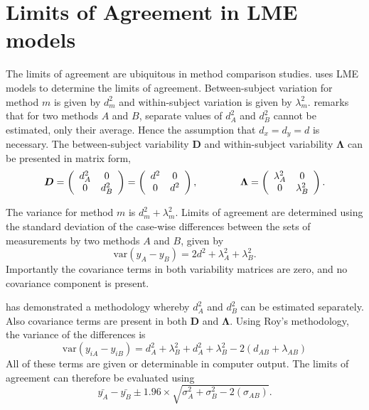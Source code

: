 \documentclass[12pt, a4paper]{report}
\theoremstyle{plain}
\theoremstyle{definition}
\theoremstyle{remark}
\begin{document}
\section{Limits of Agreement in LME models}
The limits of agreement \citep{BA86} are ubiquitous in method comparison studies. \citet{BXC2008} uses LME models to determine the limits of agreement. Between-subject variation for method $m$ is given by $d^2_{m}$ and within-subject variation is given by $\lambda^2_{m}$.  \citet{BXC2008} remarks that for two methods $A$ and $B$, separate values of $d^2_{A}$ and $d^2_{B}$ cannot be estimated, only their average. Hence the assumption that $d_{x}= d_{y}= d$ is necessary. The between-subject variability $\boldsymbol{D}$ and within-subject variability $\boldsymbol{\Lambda}$ can be presented in matrix form,\[
\boldsymbol{D} = \left(%
\begin{array}{cc}
d^2_{A}& 0 \\
0 & d^2_{B} \\
\end{array}%
\right)=\left(%
\begin{array}{cc}
d^2& 0 \\
0 & d^2\\
\end{array}%
\right),
\hspace{1.5cm}
\boldsymbol{\Lambda} = \left(%
\begin{array}{cc}
\lambda^2_{A}& 0 \\
0 & \lambda^2_{B} \\
\end{array}%
\right).
\]

The variance for method $m$ is $d^2_{m}+\lambda^2_{m}$. Limits of agreement are determined using the standard deviation of the case-wise differences between the sets of measurements by two methods $A$ and $B$, given by
\begin{equation}
\mbox{var} (y_{A}-y_{B}) = 2d^2 + \lambda^2_{A}+ \lambda^2_{B}.
\end{equation}
Importantly the covariance terms in both variability matrices are zero, and no covariance component is present.


\citet{roy} has demonstrated a methodology whereby $d^2_{A}$ and $d^2_{B}$ can be estimated separately. Also covariance terms are present in both $\boldsymbol{D}$ and $\boldsymbol{\Lambda}$. Using Roy's methodology, the variance of the differences is
\begin{equation}
\mbox{var} (y_{iA}-y_{iB})= d^2_{A} + \lambda^2_{B} + d^2_{A} + \lambda^2_{B} - 2(d_{AB} + \lambda_{AB})
\end{equation}
All of these terms are given or determinable in computer output.
The limits of agreement can therefore be evaluated using
\begin{equation}
\bar{y_{A}}-\bar{y_{B}} \pm 1.96 \times \sqrt{ \sigma^2_{A} + \sigma^2_{B}  - 2(\sigma_{AB})}.
\end{equation}
\end{document}
